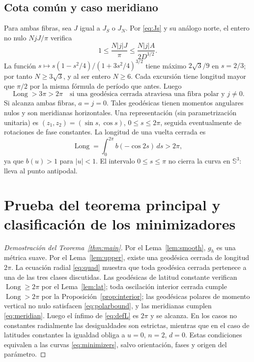 \documentclass[11pt,a4paper]{article}
\theoremstyle{remark}\newtheorem{remark}[theorem]{Observación}
\newcommand{\Sthree}{\mathbb S^3}
\newcommand{\Len}{\operatorname{Long}}
\begin{document}
\subsection{Cota común y caso meridiano}
Para ambas fibras, sea $J$ igual a $J_S$ o $J_N$. Por \eqref{eq:Js} y su análogo norte, el entero no nulo $NjJ/\pi$ verifica
\[
1\le\frac{N|j|J}{\pi}\le\frac{N|j|A}{2D^{3/2}}.
\]
La función $s\mapsto s(1-s^2/4)/(1+3s^2/4)^{3/2}$ tiene máximo $2\sqrt3/9$ en $s=2/3$; por tanto $N\ge3\sqrt3$, y al ser entero $N\ge6$. Cada excursión tiene longitud mayor que $\pi/2$ por la misma fórmula de período que antes. Luego
\begin{equation}\label{eq:polarbound}
\boxed{\Len>3\pi>2\pi\quad\text{si una geodésica cerrada atraviesa una fibra polar y }j\ne0.}
\end{equation}
Si alcanza ambas fibras, $a=j=0$. Tales geodésicas tienen momentos angulares nulos y son meridianas horizontales. Una representación (sin parametrización unitaria) es $(z_1,z_2)=(\sin s,\cos s)$, $0\le s\le2\pi$, seguida eventualmente de rotaciones de fase constantes. La longitud de una vuelta cerrada es
\begin{equation}\label{eq:meridian}
\Len=\int_0^{2\pi}b(-\cos2s)\,ds>2\pi,
\end{equation}
ya que $b(u)>1$ para $|u|<1$. El intervalo $0\le s\le\pi$ no cierra la curva en $\Sthree$: lleva al punto antipodal.

\section{Prueba del teorema principal y clasificación de los minimizadores}
\begin{proof}[Demostración del Teorema~\ref{thm:main}]
Por el Lema~\ref{lem:smooth}, $g_h$ es una métrica suave. Por el Lema~\ref{lem:upper}, existe una geodésica cerrada de longitud $2\pi$. La ecuación radial \eqref{eq:quad} muestra que toda geodésica cerrada pertenece a una de las tres clases discutidas. Las geodésicas de latitud constante verifican $\Len\ge2\pi$ por el Lema~\ref{lem:lat}; toda oscilación interior cerrada cumple $\Len>2\pi$ por la Proposición~\ref{prop:interior}; las geodésicas polares de momento vertical no nulo satisfacen \eqref{eq:polarbound}, y las meridianas cumplen \eqref{eq:meridian}. Luego el ínfimo de \eqref{eq:defL} es $2\pi$ y se alcanza. En los casos no constantes radialmente las desigualdades son estrictas, mientras que en el caso de latitudes constantes la igualdad obliga a $u=0$, $n=2$, $d=0$. Estas condiciones equivalen a las curvas \eqref{eq:minimizers}, salvo orientación, fases y origen del parámetro.
\end{proof}
\end{document}
